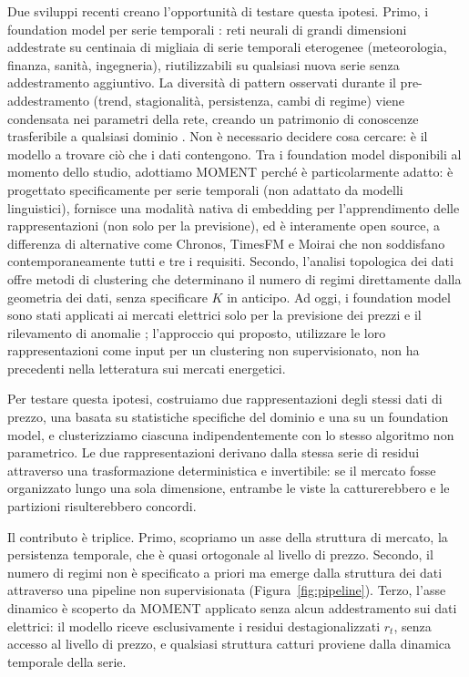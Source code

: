 \documentclass[12pt]{article}
\begin{document}
Due sviluppi recenti creano l'opportunità di testare questa ipotesi.
Primo, i foundation model per serie temporali \citep{yeh2023}: reti neurali di grandi dimensioni addestrate su centinaia di migliaia di serie temporali eterogenee (meteorologia, finanza, sanità, ingegneria), riutilizzabili su qualsiasi nuova serie senza addestramento aggiuntivo.
La diversità di pattern osservati durante il pre-addestramento (trend, stagionalità, persistenza, cambi di regime) viene condensata nei parametri della rete, creando un patrimonio di conoscenze trasferibile a qualsiasi dominio \citep{tsfm_survey2025}.
Non è necessario decidere cosa cercare: è il modello a trovare ciò che i dati contengono.
Tra i foundation model disponibili al momento dello studio, adottiamo MOMENT \citep{moment2024} perché è particolarmente adatto: è progettato specificamente per serie temporali (non adattato da modelli linguistici), fornisce una modalità nativa di embedding per l'apprendimento delle rappresentazioni (non solo per la previsione), ed è interamente open source, a differenza di alternative come Chronos, TimesFM e Moirai che non soddisfano contemporaneamente tutti e tre i requisiti.
Secondo, l'analisi topologica dei dati \citep{carlsson2009, edelsbrunner2010} offre metodi di clustering che determinano il numero di regimi direttamente dalla geometria dei dati, senza specificare $K$ in anticipo.
Ad oggi, i foundation model sono stati applicati ai mercati elettrici solo per la previsione dei prezzi \citep{tsfm_epf_benchmark2025, pricefm2025} e il rilevamento di anomalie \citep{tsfm_anomaly_energy2024}; l'approccio qui proposto, utilizzare le loro rappresentazioni come input per un clustering non supervisionato, non ha precedenti nella letteratura sui mercati energetici.


Per testare questa ipotesi, costruiamo due rappresentazioni degli stessi dati di prezzo, una basata su statistiche specifiche del dominio e una su un foundation model, e clusterizziamo ciascuna indipendentemente con lo stesso algoritmo non parametrico.
Le due rappresentazioni derivano dalla stessa serie di residui attraverso una trasformazione deterministica e invertibile: se il mercato fosse organizzato lungo una sola dimensione, entrambe le viste la catturerebbero e le partizioni risulterebbero concordi.

Il contributo è triplice.
Primo, scopriamo un asse della struttura di mercato, la persistenza temporale, che è quasi ortogonale al livello di prezzo.
Secondo, il numero di regimi non è specificato a priori ma emerge dalla struttura dei dati attraverso una pipeline non supervisionata (Figura~\ref{fig:pipeline}).
Terzo, l'asse dinamico è scoperto da MOMENT applicato senza alcun addestramento sui dati elettrici: il modello riceve esclusivamente i residui destagionalizzati $r_t$, senza accesso al livello di prezzo, e qualsiasi struttura catturi proviene dalla dinamica temporale della serie.
\end{document}
